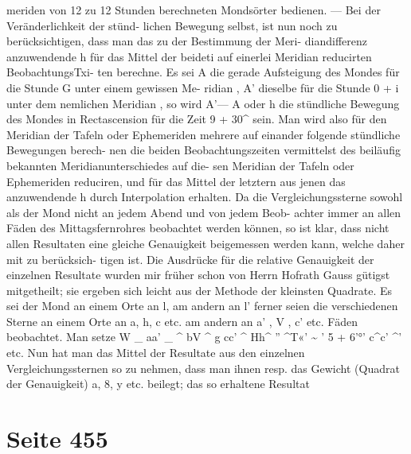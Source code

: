 \documentclass[10pt,a4paper]{article}
\begin{document}
meriden  von  12  zu  12  Stunden  berechneten  Mondsörter  bedienen.  ---  Bei  der  Veränderlichkeit  der  stünd-
lichen Bewegung  selbst,  ist  nun  noch  zu  berücksichtigen,  dass  man  das  zu  der  Bestimmung  der  Meri-
diandifferenz anzuwendende  h  für  das  Mittel  der  beideti  auf  einerlei  Meridian  reducirten  BeobachtungsTxi-
ten  berechne.  Es  sei  A  die  gerade  Aufsteigung  des  Mondes  für  die  Stunde  G  unter  einem  gewissen  Me-
ridian ,  A'  dieselbe  für  die  Stunde  0  +  i  unter  dem  nemlichen  Meridian ,  so  wird  A'---  A  oder  h  die
stündliche  Bewegung  des  Mondes  in  Rectascension  für  die  Zeit  9  +  30\glqq{}\textasciicircum{}  sein.  Man  wird  also  für  den
Meridian  der  Tafeln  oder  Ephemeriden  mehrere  auf  einander  folgende  stündliche  Bewegungen  berech-
nen die  beiden  Beobachtungszeiten  vermittelst  des  beiläufig  bekannten  Meridianunterschiedes  auf  die-
sen Meridian  der  Tafeln  oder  Ephemeriden  reduciren,  und  für  das  Mittel  der  letztern  aus  jenen  das
anzuwendende    h   durch  Interpolation  erhalten.
Da  die  Vergleichungssterne  sowohl  als  der  Mond  nicht  an  jedem  Abend  und  von  jedem  Beob-
achter immer  an  allen  Fäden  des  Mittagsfernrohres  beobachtet  werden  können,  so  ist  klar,  dass  nicht
allen  Resultaten  eine  gleiche  Genauigkeit  beigemessen  werden  kann,  welche  daher  mit  zu  berücksich-
tigen ist.  Die  Ausdrücke  für  die  relative  Genauigkeit  der  einzelnen  Resultate  wurden  mir  früher  schon
von  Herrn  Hofrath  Gauss  gütigst  mitgetheilt;  sie  ergeben  sich  leicht  aus  der  Methode  der  kleinsten
Quadrate.  Es  sei  der  Mond  an  einem  Orte  an  l,  am  andern  an  l'  ferner  seien  die  verschiedenen  Sterne
an  einem  Orte  an  a,  h,  c  etc.  am  andern  an  a' ,  V ,  c'  etc.  Fäden  beobachtet.  Man  setze
W     \_  aa'     \_  \textasciicircum{}  bV    \textasciicircum{}  g  cc'     \textasciicircum{}
Hh\textasciicircum{}  \glqq{}\glqq{}   ''         \textasciicircum{}T«\glqq{}' \textasciitilde{}  \glqq{}\glqq{}'         5  +  6'\glqq{}\glqq{}°'         c\textasciicircum{}c'       \textasciicircum{}'
etc.    Nun  hat  man  das  Mittel  der  Resultate  aus  den  einzelnen  Vergleichungssternen  so  zu  nehmen,  dass
man  ihnen  resp.  das  Gewicht  (Quadrat  der  Genauigkeit)    a,  8,  y  etc.   beilegt;  das  so  erhaltene  Resultat

\newpage
\section*{Seite 455}
\end{document}
